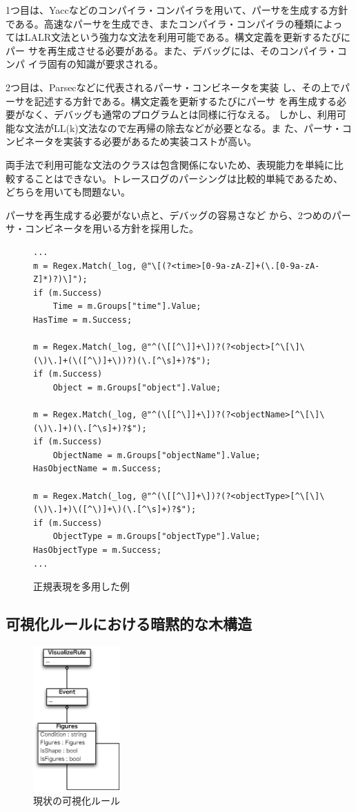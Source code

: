 1つ目は、Yaccなどのコンパイラ・コンパイラを用いて、パーサを生成する方針
である。高速なパーサを生成でき、またコンパイラ・コンパイラの種類によっ
てはLALR文法という強力な文法を利用可能である。構文定義を更新するたびにパー
サを再生成させる必要がある。また、デバッグには、そのコンパイラ・コンパ
イラ固有の知識が要求される。

2つ目は、Parsec\cite{parsec}などに代表されるパーサ・コンビネータを実装
し、その上でパーサを記述する方針である。構文定義を更新するたびにパーサ
を再生成する必要がなく、デバッグも通常のプログラムとは同様に行なえる。
しかし、利用可能な文法がLL(k)文法なので左再帰の除去などが必要となる。ま
た、パーサ・コンビネータを実装する必要があるため実装コストが高い。

両手法で利用可能な文法のクラスは包含関係にないため、表現能力を単純に比
較することはできない。トレースログのパーシングは比較的単純であるため、
どちらを用いても問題ない。

パーサを再生成する必要がない点と、デバッグの容易さなど
から、2つめのパーサ・コンビネータを用いる方針を採用した。

\begin{figure}
\centering
\begin{lstlisting}
...
m = Regex.Match(_log, @"\[(?<time>[0-9a-zA-Z]+(\.[0-9a-zA-Z]*)?)\]");
if (m.Success)
	Time = m.Groups["time"].Value;
HasTime = m.Success;

m = Regex.Match(_log, @"^(\[[^\]]+\])?(?<object>[^\[\]\(\)\.]+(\([^\)]+\))?)(\.[^\s]+)?$");
if (m.Success)
	Object = m.Groups["object"].Value;

m = Regex.Match(_log, @"^(\[[^\]]+\])?(?<objectName>[^\[\]\(\)\.]+)(\.[^\s]+)?$");
if (m.Success)
	ObjectName = m.Groups["objectName"].Value;
HasObjectName = m.Success;

m = Regex.Match(_log, @"^(\[[^\]]+\])?(?<objectType>[^\[\]\(\)\.]+)\([^\)]+\)(\.[^\s]+)?$");
if (m.Success)
	ObjectType = m.Groups["objectType"].Value;
HasObjectType = m.Success;
...
\end{lstlisting}
\caption{正規表現を多用した例}\label{fig:regexp}
\end{figure} %

\subsection{可視化ルールにおける暗黙的な木構造}
\begin{figure}
\centering
\includegraphics[width=0.3\textwidth]{current.eps}
\caption{現状の可視化ルール}\label{fig:current}
\end{figure}

